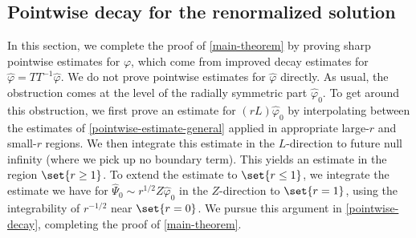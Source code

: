 \documentclass[10pt, reqno]{amsart}
\begin{document}
\subsection{Pointwise decay for the renormalized solution}
\label{late-time-pointwise} In this section, we complete the proof of
\cref{main-theorem} by proving sharp pointwise estimates for \(\varphi{}\), which
come from improved decay estimates for \(\widehat{\varphi{}} =
TT^{-1}\widehat{\varphi{}}\). We do not prove pointwise estimates for
\(\widehat{\varphi{}}\) directly. As usual, the obstruction comes at the level
of the radially symmetric part \(\widehat{\varphi{}}_0\). To get around this
obstruction, we first prove an estimate for \((rL)\widehat{\varphi{}}_0\) by
interpolating between the estimates of \cref{pointwise-estimate-general} applied in
appropriate large-\(r\) and small-\(r\) regions. We then integrate this estimate
in the \(L\)-direction to future null infinity (where we pick up no boundary
term). This yields an estimate in the region \(\set{r\ge 1}\). To extend the
estimate to \(\set{r\le 1}\), we integrate the estimate we have for
\(\widehat{\Psi{}}_0\sim r^{1/2}Z\widehat{\varphi{}}_0\) in the \(Z\)-direction
to \(\set{r=1}\), using the integrability of \(r^{-1/2}\) near \(\set{r=0}\). We
pursue this argument in \cref{pointwise-decay}, completing the proof of
\cref{main-theorem}.
\end{document}
